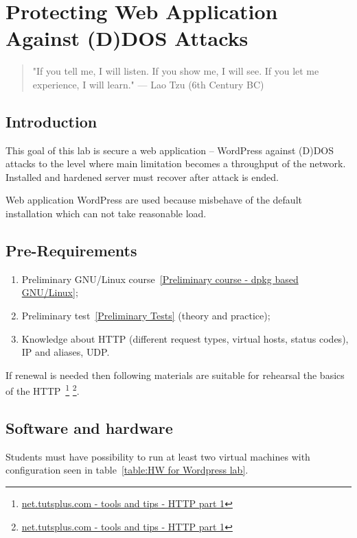 

\chapter{Protecting Web Application Against (D)DOS Attacks}
\label{Protecting Web Application Against (D)DOS Attacks}

 
\begin{quote}
"If you tell me, I will listen. If you show me, I
will see. If you let me experience, I will learn." --- Lao Tzu (6th Century BC)
\end{quote}

\section{Introduction}
This goal of this lab is secure a web application -- WordPress against (D)DOS attacks to the level where main limitation becomes a throughput of the network. Installed and hardened server must recover after attack is ended.

Web application WordPress are used because misbehave of the default installation which can not take reasonable load.

\section{Pre-Requirements}
\begin{enumerate}
\item Preliminary GNU/Linux course~\ref{Preliminary course - dpkg based GNU/Linux}; 
\item Preliminary test~\ref{Preliminary Tests} (theory and practice);
\item Knowledge about \gls{HTTP} (different request types, virtual hosts, status codes), \gls{IP} and aliases, \gls{UDP}.

\end{enumerate}

If renewal is needed then following materials are suitable for rehearsal the basics of the \gls{HTTP}~\footnote{
\href{http://net.tutsplus.com/tutorials/tools-and-tips/http-the-protocol-every-web-developer-must-know-part-1/}{net.tutsplus.com - tools and tips - HTTP part 1}} \footnote{
\href{http://net.tutsplus.com/tutorials/tools-and-tips/http-the-protocol-every-web-developer-must-know-part-2/}{net.tutsplus.com - tools and tips - HTTP part 1}}.

\section{Software and hardware}
Students must have possibility to run at least two virtual machines with configuration seen in table~\ref{table:HW for Wordpress lab}.

